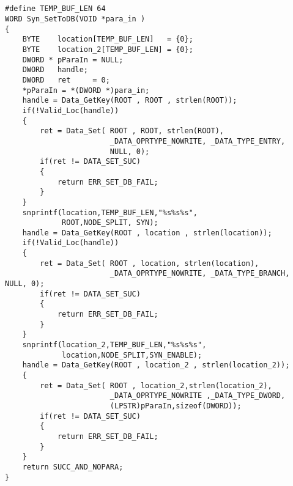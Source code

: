 ﻿\documentclass  [11pt,onecolumn]{article}
\begin{document}
\subsection{}
\begin{lstlisting}
#define TEMP_BUF_LEN 64
WORD Syn_SetToDB(VOID *para_in )
{
    BYTE    location[TEMP_BUF_LEN]   = {0};
    BYTE    location_2[TEMP_BUF_LEN] = {0};
    DWORD * pParaIn = NULL;
    DWORD   handle;
    DWORD   ret     = 0;
    *pParaIn = *(DWORD *)para_in;
    handle = Data_GetKey(ROOT , ROOT , strlen(ROOT));            
    if(!Valid_Loc(handle))
    { 
        ret = Data_Set( ROOT , ROOT, strlen(ROOT),
                        _DATA_OPRTYPE_NOWRITE, _DATA_TYPE_ENTRY,
                        NULL, 0);
        if(ret != DATA_SET_SUC)
        {
            return ERR_SET_DB_FAIL;
        }
    }
    snprintf(location,TEMP_BUF_LEN,"%s%s%s",
             ROOT,NODE_SPLIT, SYN);
    handle = Data_GetKey(ROOT , location , strlen(location));            
    if(!Valid_Loc(handle))
    { 
        ret = Data_Set( ROOT , location, strlen(location),
                        _DATA_OPRTYPE_NOWRITE, _DATA_TYPE_BRANCH, NULL, 0);
        if(ret != DATA_SET_SUC)
        {
            return ERR_SET_DB_FAIL;
        }
    }    
    snprintf(location_2,TEMP_BUF_LEN,"%s%s%s",
             location,NODE_SPLIT,SYN_ENABLE);
    handle = Data_GetKey(ROOT , location_2 , strlen(location_2));            
    {
        ret = Data_Set( ROOT , location_2,strlen(location_2),
                        _DATA_OPRTYPE_NOWRITE ,_DATA_TYPE_DWORD,
                        (LPSTR)pParaIn,sizeof(DWORD)); 
        if(ret != DATA_SET_SUC)
        {
            return ERR_SET_DB_FAIL;
        }
    }
    return SUCC_AND_NOPARA;
}
\end{lstlisting}
\end{document}
